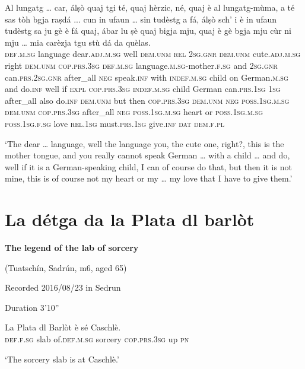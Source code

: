 \begin{linenumbers}
\gll    Al lungatg … car, álṣò quaj tgi té, quaj hèrzic, né, quaj è al lungatg-mùma, a té sas tòh bgja raṣdá ... cun in ufaun … sin tudèstg a fá, álṣò sch’ i è in ufaun tudèstg sa ju gè è fá quaj, ábar lu ṣè quaj bigja mju, quaj è gè bgja mju cùr ni mju … mia carèzja tgu stù dá da quèlas.\\ 
 \textsc{def.m.sg} language {} dear.\textsc{adj.m.sg} well \textsc{dem.unm} \textsc{rel} \textsc{2sg.gnr} \textsc{dem.unm} cute.\textsc{adj.m.sg} right \textsc{dem.unm} \textsc{cop.prs.3sg} \textsc{def.m.sg} language.\textsc{m.sg}-mother.\textsc{f.sg} and \textsc{2sg.gnr} can.\textsc{prs.2sg.gnr} after\_all \textsc{neg} speak.\textsc{inf} {} with \textsc{indef.m.sg} child {} on German.\textsc{m.sg} and do.\textsc{inf} well if \textsc{expl} \textsc{cop.prs.3sg} \textsc{indef.m.sg} child German can.\textsc{prs.1sg} \textsc{1sg} after\_all also do.\textsc{inf} \textsc{dem.unm} but then \textsc{cop.prs.3sg} \textsc{dem.unm} \textsc{neg} \textsc{poss.1sg.m.sg} \textsc{dem.unm} \textsc{cop.prs.3sg} after\_all \textsc{neg} \textsc{poss.1sg.m.sg} heart or \textsc{poss.1sg.m.sg} {} \textsc{poss.1sg.f.sg} love \textsc{rel.1sg} must.\textsc{prs.1sg} give.\textsc{inf} \textsc{dat} \textsc{dem.f.pl}\\
\end{linenumbers}
\medskip
\glt `The dear … language, well the language you, the cute one, right?, this is the mother tongue, and you really cannot speak German … with a child … and do, well if it is a German-speaking child, I can of course do that, but then it is not mine, this is of course not my heart or my … my love that I have to give them.'
\medskip


\section{La détga da la Plata dl barlòt}

\noindent
\textbf{The legend of the lab of sorcery}

\noindent
(Tuatschín, Sadrún, m6, aged 65)

\noindent
Recorded 2016/08/23 in Sedrun

\noindent
Duration 3'10''

\bigskip

\begin{linenumbers}
\gll    La Plata dl Barlòt è sé Caschlè.\\
 \textsc{def.f.sg} slab of.\textsc{def.m.sg} sorcery \textsc{cop.prs.3sg} up \textsc{pn}\\
\end{linenumbers}
\medskip
\glt `The sorcery slab is at Caschlè.'
\medskip

